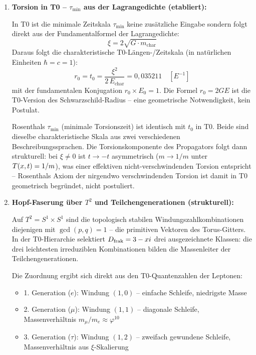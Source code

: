 \begin{enumerate}

  \item \textbf{Torsion in T0 -- $\tau_{\min}$ aus der Lagrangedichte (etabliert):}

  In T0 ist die minimale Zeitskala $\tau_{\min}$ keine zusätzliche Eingabe sondern folgt direkt aus der Fundamentalformel der Lagrangedichte:
  \begin{equation}
    \xi = 2\sqrt{G \cdot m_{\text{char}}}
  \end{equation}
  Daraus folgt die charakteristische T0-Längen-/Zeitskala (in natürlichen Einheiten $\hbar = c = 1$):
  \begin{equation}
    r_0 = t_0 = \frac{\xi^2}{2\,E_{\text{char}}} = 0{,}035211 \quad [E^{-1}]
  \end{equation}
  mit der fundamentalen Konjugation $r_0 \times E_0 = 1$. Die Formel $r_0 = 2GE$ ist die T0-Version des Schwarzschild-Radius -- eine geometrische Notwendigkeit, kein Postulat.

  Rosenthals $\tau_{\min}$ (minimale Torsionszeit) ist identisch mit $t_0$ in T0. Beide sind dieselbe charakteristische Skala aus zwei verschiedenen Beschreibungssprachen. Die Torsionskomponente des Propagators folgt dann strukturell: bei $\xi \neq 0$ ist $t \to -t$ asymmetrisch ($m \to 1/m$ unter $T(x,t) = 1/m$), was einer effektiven nicht-verschwindenden Torsion entspricht -- Rosenthals Axiom der nirgendwo verschwindenden Torsion ist damit in T0 geometrisch begründet, nicht postuliert.

  \item \textbf{Hopf-Faserung über $T^2$ und Teilchengenerationen (strukturell):}

  Auf $T^2 = S^1 \times S^1$ sind die topologisch stabilen Windungszahlkombinationen diejenigen mit $\gcd(p,q) = 1$ -- die primitiven Vektoren des Torus-Gitters. In der T0-Hierarchie selektiert $D_{\text{frak}} = 3 - xi$ drei ausgezeichnete Klassen: die drei leichtesten irreduziblen Kombinationen bilden die Massenleiter der Teilchengenerationen.

  Die Zuordnung ergibt sich direkt aus den T0-Quantenzahlen der Leptonen:
  \begin{itemize}[noitemsep]
    \item 1. Generation ($e$): Windung $(1,0)$ -- einfache Schleife, niedrigste Masse
    \item 2. Generation ($\mu$): Windung $(1,1)$ -- diagonale Schleife, Massenverhältnis $m_\mu/m_e \approx \varphi^{10}$
    \item 3. Generation ($\tau$): Windung $(1,2)$ -- zweifach gewundene Schleife, Massenverhältnis aus $\xi$-Skalierung
  \end{itemize}


\end{enumerate}
